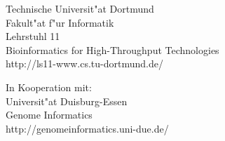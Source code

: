 \begin{titlepage}
	\vspace*{2.0cm}
	\hspace*{\links}
	\begin{minipage}[b]{8cm}
		\raggedright
		Technische Universit"at Dortmund \\
		Fakult"at f"ur Informatik\\
		Lehrstuhl 11 \\Bioinformatics for High-Throughput Technologies\\
		http://ls11-www.cs.tu-dortmund.de/
	\end{minipage}
	\begin{minipage}[b]{8cm}
	\raggedleft
	In Kooperation mit:\\
	Universit"at Duisburg-Essen\\
	Genome Informatics\\
	http://genomeinformatics.uni-due.de/
	\end{minipage}
	
\end{titlepage}
